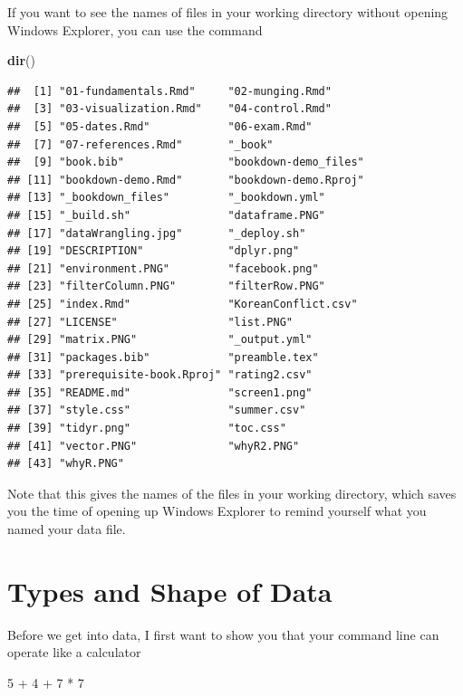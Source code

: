 \documentclass[]{book}
\newenvironment{Shaded}{\begin{snugshade}}{\end{snugshade}}
\newcommand{\KeywordTok}[1]{\textcolor[rgb]{0.13,0.29,0.53}{\textbf{{#1}}}}
\newcommand{\DecValTok}[1]{\textcolor[rgb]{0.00,0.00,0.81}{{#1}}}
\newcommand{\StringTok}[1]{\textcolor[rgb]{0.31,0.60,0.02}{{#1}}}
\newcommand{\NormalTok}[1]{{#1}}
\begin{document}
If you want to see the names of files in your working directory without
opening Windows Explorer, you can use the command

\begin{Shaded}
\begin{Highlighting}[]
\KeywordTok{dir}\NormalTok{()}
\end{Highlighting}
\end{Shaded}

\begin{verbatim}
##  [1] "01-fundamentals.Rmd"     "02-munging.Rmd"         
##  [3] "03-visualization.Rmd"    "04-control.Rmd"         
##  [5] "05-dates.Rmd"            "06-exam.Rmd"            
##  [7] "07-references.Rmd"       "_book"                  
##  [9] "book.bib"                "bookdown-demo_files"    
## [11] "bookdown-demo.Rmd"       "bookdown-demo.Rproj"    
## [13] "_bookdown_files"         "_bookdown.yml"          
## [15] "_build.sh"               "dataframe.PNG"          
## [17] "dataWrangling.jpg"       "_deploy.sh"             
## [19] "DESCRIPTION"             "dplyr.png"              
## [21] "environment.PNG"         "facebook.png"           
## [23] "filterColumn.PNG"        "filterRow.PNG"          
## [25] "index.Rmd"               "KoreanConflict.csv"     
## [27] "LICENSE"                 "list.PNG"               
## [29] "matrix.PNG"              "_output.yml"            
## [31] "packages.bib"            "preamble.tex"           
## [33] "prerequisite-book.Rproj" "rating2.csv"            
## [35] "README.md"               "screen1.png"            
## [37] "style.css"               "summer.csv"             
## [39] "tidyr.png"               "toc.css"                
## [41] "vector.PNG"              "whyR2.PNG"              
## [43] "whyR.PNG"
\end{verbatim}

Note that this gives the names of the files in your working directory,
which saves you the time of opening up Windows Explorer to remind
yourself what you named your data file.

\section{Types and Shape of Data}\label{types-and-shape-of-data}

Before we get into data, I first want to show you that your command line
can operate like a calculator

\begin{Shaded}
\begin{Highlighting}[]
\DecValTok{5} \NormalTok{+}\StringTok{ }\DecValTok{4} \NormalTok{+}\StringTok{ }\DecValTok{7} \NormalTok{*}\StringTok{ }\DecValTok{7}
\end{Highlighting}
\end{Shaded}
\end{document}
